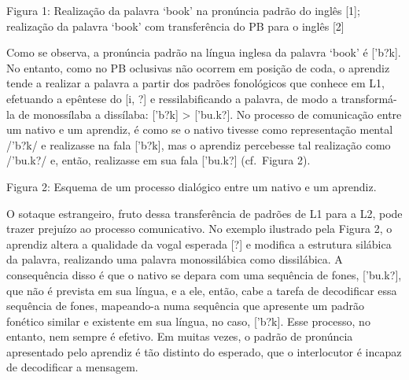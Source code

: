 Figura 1: Realiza\c{c}\~ao da palavra `book' na pron\'uncia padr\~ao do ingl\^es
{[}1{]}; realiza\c{c}\~ao da palavra `book' com transfer\^encia do PB para o
ingl\^es {[}2{]}

Como se observa, a pron\'uncia padr\~ao na l\'ingua inglesa da palavra `book'
\'e {[}'b?k{]}. No entanto, como no PB oclusivas n\~ao ocorrem em posi\c{c}\~ao de
coda, o aprendiz tende a realizar a palavra a partir dos padr\~oes
fonol\'ogicos que conhece em L1, efetuando a ep\^entese do {[}i, ?{]} e
ressilabificando a palavra, de modo a transform\'a-la de monoss\'ilaba a
diss\'ilaba: {[}'b?k{]} \textgreater{} {[}'bu.k?{]}. No processo de
comunica\c{c}\~ao entre um nativo e um aprendiz, \'e como se o nativo tivesse
como representa\c{c}\~ao mental /'b?k/ e realizasse na fala {[}'b?k{]}, mas o
aprendiz percebesse tal realiza\c{c}\~ao como /'bu.k?/ e, ent\~ao, realizasse em
sua fala {[}'bu.k?{]} (cf.~Figura 2).

Figura 2: Esquema de um processo dial\'ogico entre um nativo e um
aprendiz.

O sotaque estrangeiro, fruto dessa transfer\^encia de padr\~oes de L1 para a
L2, pode trazer preju\'izo ao processo comunicativo. No exemplo ilustrado
pela Figura 2, o aprendiz altera a qualidade da vogal esperada {[}?{]} e
modifica a estrutura sil\'abica da palavra, realizando uma palavra
monossil\'abica como dissil\'abica. A consequ\^encia disso \'e que o nativo se
depara com uma sequ\^encia de fones, {[}'bu.k?{]}, que n\~ao \'e prevista em
sua l\'ingua, e a ele, ent\~ao, cabe a tarefa de decodificar essa sequ\^encia
de fones, mapeando-a numa sequ\^encia que apresente um padr\~ao fon\'etico
similar e existente em sua l\'ingua, no caso, {[}'b?k{]}. Esse processo,
no entanto, nem sempre \'e efetivo. Em muitas vezes, o padr\~ao de pron\'uncia
apresentado pelo aprendiz \'e t\~ao distinto do esperado, que o interlocutor
\'e incapaz de decodificar a mensagem.

